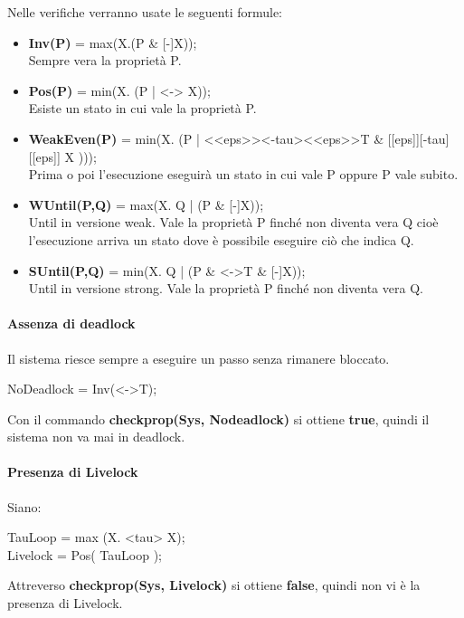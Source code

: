 Nelle verifiche verranno usate le seguenti formule:
\begin{itemize}
	\item \textbf{Inv(P)} = \textsf{max(X.(P \& [-]X));}\\
	Sempre vera la proprietà P.
	\item \textbf{Pos(P)} = \textsf{min(X. (P | <-> X));}\\
	Esiste un stato in cui vale la proprietà P.
	\item \textbf{WeakEven(P)} = \textsf{min(X. (P | <<eps>><-tau><<eps>>T \& [[eps]][-tau][[eps]] X )));}\\
	Prima o poi l'esecuzione eseguirà un stato in cui vale P oppure P vale subito.
	\item \textbf{WUntil(P,Q)} = \textsf{max(X. Q | (P \& [-]X));}\\
	Until in versione weak. Vale la proprietà P finché non diventa vera Q cioè l'esecuzione arriva un stato dove è possibile eseguire ciò che indica Q.
	\item \textbf{SUntil(P,Q)} = \textsf{min(X. Q | (P \& <->T \& [-]X));}\\
	Until in versione strong. Vale la proprietà P finché non diventa vera Q.
\end{itemize}

\paragraph{Assenza di deadlock}\mbox{}

Il sistema riesce sempre a eseguire un passo senza rimanere bloccato.

\begin{center}
	\textsf{NoDeadlock = Inv(<->T);}
\end{center}

Con il commando \textbf{checkprop(Sys, Nodeadlock)} si ottiene \textbf{true}, quindi il sistema non va mai in deadlock.

\paragraph{Presenza di Livelock}\mbox{}

Siano:

\begin{center}
	\textsf{TauLoop = max (X. <tau> X);}\\
	\textsf{Livelock = Pos( TauLoop );}
\end{center}

Attreverso \textbf{checkprop(Sys, Livelock)} si ottiene \textbf{false}, quindi non vi è la presenza di Livelock.

